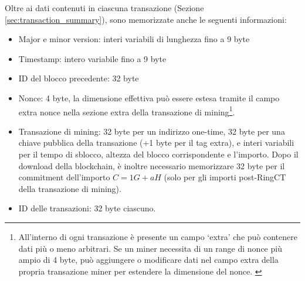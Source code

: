 Oltre ai dati contenuti in ciascuna transazione (Sezione \ref{sec:transaction_summary}), sono memorizzate anche le seguenti informazioni:
\begin{itemize}
\setlength\itemsep{\listspace}
\item Major e minor version: interi variabili di lunghezza fino a 9 byte
\item Timestamp: intero variabile fino a 9 byte
\item ID del blocco precedente: 32 byte
\item Nonce: 4 byte, la dimensione effettiva può essere estesa tramite il campo extra nonce nella sezione extra della transazione di mining\footnote{All'interno di ogni transazione è presente un campo `extra' che può contenere dati più o meno arbitrari. Se un miner necessita di un range di nonce più ampio di 4 byte, può aggiungere o modificare dati nel campo extra della propria transazione miner per estendere la dimensione del nonce. \cite{extra-field-stackexchange}}.
\item Transazione di mining: 32 byte per un indirizzo one-time, 32 byte per una chiave pubblica della transazione (+1 byte per il tag extra), e interi variabili per il tempo di sblocco, altezza del blocco corrispondente e l’importo. Dopo il download della blockchain, è inoltre necessario memorizzare 32 byte per il commitment dell’importo $C = 1G + a H$ (solo per gli importi post-RingCT della transazione di mining).
\item ID delle transazioni: 32 byte ciascuno.
\end{itemize}
